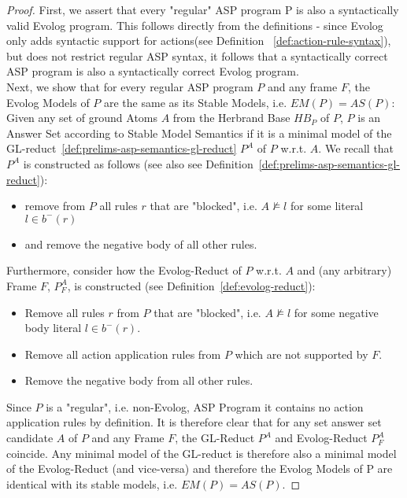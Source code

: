 \begin{proof}
First, we assert that every "regular" ASP program P is also a syntactically valid Evolog program. This follows directly from the definitions - since Evolog only adds syntactic support for actions(see Definition ~\ref{def:action-rule-syntax}), but does not restrict regular ASP syntax, it follows that a syntactically correct ASP program is also a syntactically correct Evolog program. \\
Next, we show that for every regular ASP program $P$ and any frame $F$, the Evolog Models of $P$ are the same as its Stable Models, i.e. $\mathit{EM}(P)=\mathit{AS}(P)$: \\
Given any set of ground Atoms $A$ from the Herbrand Base $HB_P$ of $P$, $P$ is an Answer Set according to Stable Model Semantics if it is a minimal model of the GL-reduct~\ref{def:prelims-asp-semantics-gl-reduct} $P^{A}$ of $P$ w.r.t. $A$. We recall that $P^{A}$ is constructed as follows (see also see Definition~\ref{def:prelims-asp-semantics-gl-reduct}):
\begin{itemize}
	\item remove from $P$ all rules $r$ that are "blocked", i.e. $A \not\models l$ for some literal $l \in b^{-}(r)$ 
	\item and remove the negative body of all other rules.
\end{itemize}
Furthermore, consider how the Evolog-Reduct of $P$ w.r.t. $A$ and (any arbitrary) Frame $F$, $P_{F}^{A}$, is constructed (see Definition~\ref{def:evolog-reduct}):
\begin{itemize}
	\item Remove all rules $r$ from $P$ that are "blocked", i.e. $A \not\models l$ for some negative body literal $l \in b^{-}(r)$.
	\item Remove all action application rules from $P$ which are not supported by $F$.
	\item Remove the negative body from all other rules.
\end{itemize}
Since $P$ is a "regular", i.e. non-Evolog, ASP Program it contains no action application rules by definition. It is therefore clear that for any set answer set candidate $A$ of $P$ and any Frame $F$, the GL-Reduct $P^{A}$ and Evolog-Reduct $P_{F}^{A}$ coincide. Any minimal model of the GL-reduct is therefore also a minimal model of the Evolog-Reduct (and vice-versa) and therefore the Evolog Models of P are identical with its stable models, i.e. $\mathit{EM}(P)=\mathit{AS}(P)$.
\end{proof}

